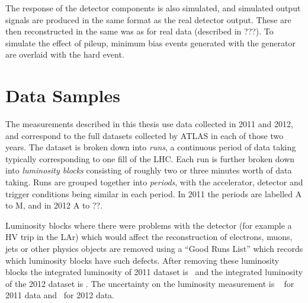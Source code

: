 The response of the detector components is also
simulated, and simulated output signals are produced in the same format as the
real
detector output. These are then reconstructed in the same was as
for real data (described in ???). To simulate the effect of pileup, minimum bias events generated with the \pythia
generator are overlaid with the hard event.

\section{Data Samples}

The measurements described in this thesis use data collected in 2011 and 2012,
and correspond to the full datasets collected by ATLAS in each of those two
years. The dataset is broken down into {\it runs}, a continuous period of data
taking typically corresponding to one fill of the LHC. Each run is further
broken down into {\it luminosity blocks} consisting of roughly two or three
minutes worth of data taking. Runs are grouped together into {\it periods}, with
the accelerator, detector and trigger conditions being similar in each period.
In 2011 the periods are labelled A to M, and in 2012 A to ??.

Luminosity blocks where there were problems with the detector (for example a HV
trip in the LAr) which would affect the reconstruction of electrons, muons, jets
or other physics objects are removed using a ``Good Runs List'' which records
which luminosity blocks have such defects. After removing these luminosity blocks
the integrated luminosity of 2011 dataset is \LumiPassGRLTwentyEleven\ and the integrated luminosity
of the 2012 dataset is \LumiPassGRLTwentyTwelve. The uncertainty on the
luminosity measurement is \LumiUncTwentyEleven~\cite{ATLAS-CONF-2011-116,Aad:2011dr} for 2011 data and
\LumiUncTwentyTwelve\ for 2012 data.

